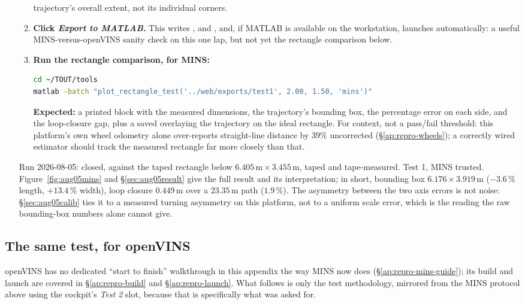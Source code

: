 \begin{enumerate}[leftmargin=1.4em]
\begin{enumerate}[leftmargin=1.2em]
  trajectory's overall extent, not its individual corners.
\item \textbf{Click \emph{Export to MATLAB}.} This writes
  ,  and
  , and, if MATLAB is available on the workstation,
  launches  automatically: a useful
  MINS-versus-openVINS sanity check on this one lap, but not yet the
  rectangle comparison below.
\item \textbf{Run the rectangle comparison, for MINS:}
\begin{lstlisting}[language=bash]
cd ~/TOUT/tools
matlab -batch "plot_rectangle_test('../web/exports/test1', 2.00, 1.50, 'mins')"
\end{lstlisting}
  \textbf{Expected:} a printed block with the measured dimensions, the
  trajectory's bounding box, the percentage error on each side, and the
  loop-closure gap, plus a saved  overlaying
  the trajectory on the ideal rectangle. For context, not a pass/fail
  threshold: this platform's own wheel odometry alone over-reports
  straight-line distance by $39\%$ uncorrected (\S\ref{ap:repro-wheels});
  a correctly wired estimator should track the measured rectangle far more
  closely than that.
\end{enumerate}
\begin{casestudy}{Run 2026-08-05: closed, against the taped rectangle below}
$6.405\,\text{m}\times3.455\,\text{m}$, taped and tape-measured. Test 1,
MINS trusted. Figure~\ref{fig:aug05mins} and \S\ref{sec:aug05result} give
the full result and its interpretation; in short, bounding box
$6.176\times3.919$\,m ($-3.6\,\%$ length, $+13.4\,\%$ width), loop closure
$0.449$\,m over a $23.35$\,m path ($1.9\,\%$). The asymmetry between the two
axis errors is not noise: \S\ref{sec:aug05calib} ties it to a measured
turning asymmetry on this platform, not to a uniform scale error, which is
the reading the raw bounding-box numbers alone cannot give.
\end{casestudy}
\end{enumerate}

\subsection{The same test, for openVINS}
\label{ap:repro-rect-vins}
openVINS has no dedicated ``start to finish'' walkthrough in this appendix
the way MINS now does (\S\ref{ap:repro-mins-guide}); its build and launch
are covered in \S\ref{ap:repro-build} and \S\ref{ap:repro-launch}. What
follows is only the test methodology, mirrored from the MINS protocol
above using the cockpit's \emph{Test 2} slot, because that is specifically
what was asked for.

